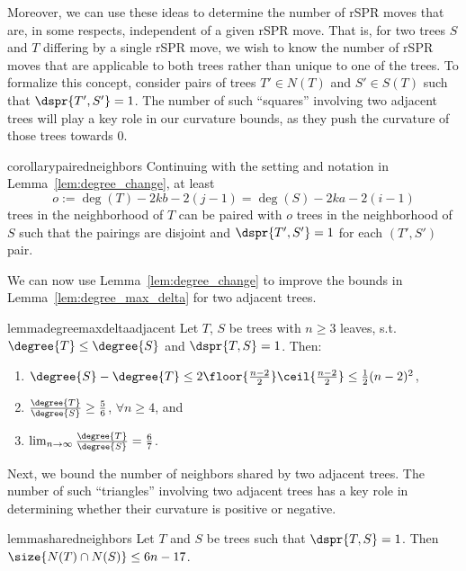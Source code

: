 \documentclass[11pt]{amsart}
\newcommand{\cuttable}[2][]{%
    \ifthenelse{\equal{#1}{}}%
		{}%
		{#1}%
}
\begin{document}
Moreover, we can use these ideas to determine the number of rSPR moves that are, in some respects, independent of a given rSPR move.
That is, for two trees $S$ and $T$ differing by a single rSPR move, we wish to know the number of rSPR moves that are applicable to both trees rather than unique to one of the trees.
To formalize this concept, consider pairs of trees $T' \in N(T)$ and $S' \in S(T)$ such that $\dspr{T',S'} = 1$.
The number of such ``squares'' involving two adjacent trees will play a key role in our curvature bounds, as they push the curvature of those trees towards 0.

\begin{restatable}{corollary}{pairedneighbors}
\label{cor:paired_neighbors}
Continuing with the setting and notation in Lemma~\ref{lem:degree_change}, at least
$$o := \deg(T) - 2kb - 2(j-1) = \deg(S) - 2ka - 2(i-1)$$
trees in the neighborhood of $T$ can be paired with $o$ trees in the neighborhood of $S$ such that the pairings are disjoint and $\dspr{T',S'} = 1$ for each $(T',S')$ pair.
\end{restatable}

We can now use Lemma~\ref{lem:degree_change} to improve the bounds in Lemma~\ref{lem:degree_max_delta} for two adjacent trees.
\begin{restatable}{lemma}{degreemaxdeltaadjacent}
	\label{lem:degree_max_delta_adjacent}
	Let $T$, $S$ be trees with $n \ge 3$ leaves, s.t. $\degree{T} \le \degree{S}$ and $\dspr{T,S} = 1$.
	Then:
	\begin{enumerate}
		\item $\degree{S} - \degree{T} \le 2\floor{\frac{n-2}{2}}\ceil{\frac{n-2}{2}} \le \frac{1}{2} (n-2)^2 $,
		\item $\frac{\degree{T}}{\degree{S}} \ge \frac{5}{6}$, $\forall n \ge 4$, and
		\item $\lim_{n\rightarrow\infty}\frac{\degree{T}}{\degree{S}} =  \frac{6}{7}$.
	\end{enumerate}
\end{restatable}


Next, we bound the number of neighbors shared by two adjacent trees.
The number of such ``triangles'' involving two adjacent trees has a key role in determining whether \cuttable[their]{the} curvature \cuttable{of two adjacent trees }is positive or negative.

\begin{restatable}{lemma}{sharedneighbors}
	\label{lem:shared_neighbors}
Let $T$ and $S$ be trees such that $\dspr{T,S} = 1$.
Then $\size{N(T) \cap N(S)} \le 6n - 17$.
\end{restatable}
\end{document}
